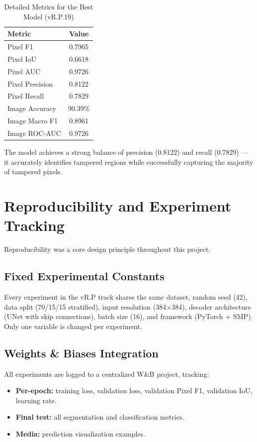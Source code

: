 \documentclass[conference]{IEEEtran}
\begin{document}
\begin{table}[H]
\centering
\caption{Detailed Metrics for the Best Model (vR.P.19)}
\label{tab:detailed_metrics}
\begin{tabular}{l c}
\toprule
\textbf{Metric} & \textbf{Value} \\
\midrule
Pixel F1 & 0.7965 \\
Pixel IoU & 0.6618 \\
Pixel AUC & 0.9726 \\
Pixel Precision & 0.8122 \\
Pixel Recall & 0.7829 \\
Image Accuracy & 90.39\% \\
Image Macro F1 & 0.8961 \\
Image ROC-AUC & 0.9726 \\
\bottomrule
\end{tabular}
\end{table}

The model achieves a strong balance of precision (0.8122) and recall (0.7829) --- it accurately identifies tampered regions while successfully capturing the majority of tampered pixels.


\section{Reproducibility and Experiment Tracking}

Reproducibility was a core design principle throughout this project.

\subsection{Fixed Experimental Constants}

Every experiment in the vR.P track shares the same dataset, random seed (42), data split (70/15/15 stratified), input resolution (384$\times$384), decoder architecture (UNet with skip connections), batch size (16), and framework (PyTorch + SMP). Only one variable is changed per experiment.

\subsection{Weights \& Biases Integration}

All experiments are logged to a centralized W\&B project, tracking:
\begin{itemize}
    \item \textbf{Per-epoch:} training loss, validation loss, validation Pixel F1, validation IoU, learning rate.
    \item \textbf{Final test:} all segmentation and classification metrics.
    \item \textbf{Media:} prediction visualization examples.
\end{itemize}
\end{document}
